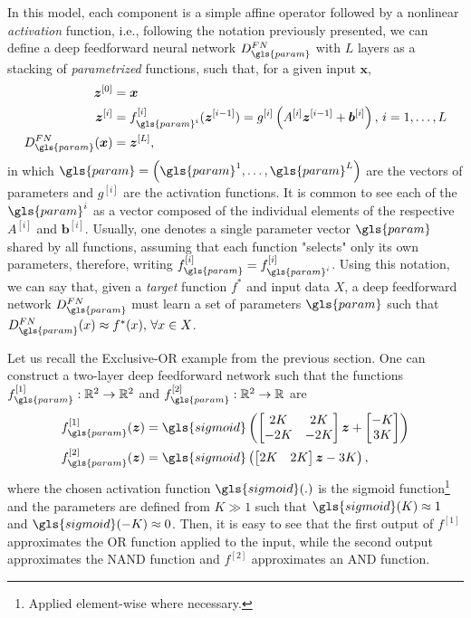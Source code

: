 In this model, each component is a simple affine operator followed by a nonlinear \textit{activation} function, i.e., following the notation previously presented, we can define a deep feedforward neural network $D_{\gls{param}}^{FN}$ with $L$ layers as a stacking of \textit{parametrized} functions, such that, for a given input $\bm{x}$,
\begin{align*}
    \bm{z}^{[0]} &= \bm{x} \\
    \bm{z}^{[i]} &= f_{\gls{param}^i}^{[i]}(\bm{z}^{[i-1]}) = g^{[i]}\left(A^{[i]}\bm{z}^{[i-1]} + \bm{b}^{[i]}\right) ,\,i=1,\ldots,L \\
    D_{\gls{param}}^{FN}(\bm{x}) &= \bm{z}^{[L]}
,\end{align*}
in which $\gls{param}=\left( \gls{param}^1,\ldots,\gls{param}^L \right) $ are the vectors of parameters and $g^{[i]}$ are the activation functions.
It is common to see each of the $\gls{param}^i$ as a vector composed of the individual elements of the respective $A^{[i]}$ and $\bm{b}^{[i]}$.
Usually, one denotes a single parameter vector $\gls{param}$ shared by all functions, assuming that each function "selects" only its own parameters, therefore, writing $f_{\gls{param}}^{[i]} = f_{\gls{param}^i}^{[i]}$.
Using this notation, we can say that, given a \textit{target} function $f^*$ and input data $X$, a deep feedforward network $D_{\gls{param}}^{FN}$ must learn a set of parameters $\gls{param}$ such that $D^{FN}_{\gls{param}}(x) \approx f^*(x),\,\forall x \in X$.

Let us recall the Exclusive-OR example from the previous section. One can construct a two-layer deep feedforward network such that the functions $f_{\gls{param}}^{[1]}:\R^2\to\R^2$ and $f_{\gls{param}}^{[2]}:\R^2\to\R$ are
\begin{align*}
    f_{\gls{param}}^{[1]}(\bm{z}) &= \gls{sigmoid}\left(
    \begin{bmatrix}
    2K & 2K \\
    -2K & -2K
    \end{bmatrix}\bm{z} + \begin{bmatrix}
    -K \\
    3K
    \end{bmatrix}\right) \\
    f_{\gls{param}}^{[2]}(\bm{z}) &= \gls{sigmoid}\left(
    \begin{bmatrix}
    2K & 2K
    \end{bmatrix}\bm{z} - 3K\right)
,\end{align*}
where the chosen activation function $\gls{sigmoid}(.)$ is the sigmoid function\footnote{Applied element-wise where necessary.} and the parameters are defined from $K \gg 1$ such that $\gls{sigmoid}(K) \approx 1$ and $\gls{sigmoid}(-K) \approx 0$.
Then, it is easy to see that the first output of $f^{[1]}$ approximates the OR function applied to the input, while the second output approximates the NAND function and $f^{[2]}$ approximates an AND function.

